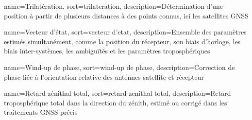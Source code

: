 {
    name={Trilatération},
    sort={trilateration},
    description={Détermination d'une position à partir de plusieurs distances à des points connus, ici les satellites GNSS}
}

{
    name={Vecteur d'état},
    sort={vecteur d'etat},
    description={Ensemble des paramètres estimés simultanément, comme la position du récepteur, son biais d'horloge, les biais inter-systèmes, les ambiguïtés et les paramètres troposphériques}
}

{
    name={Wind-up de phase},
    sort={wind-up de phase},
    description={Correction de phase liée à l'orientation relative des antennes satellite et récepteur}
}

{
    name={Retard zénithal total},
    sort={retard zenithal total},
    description={Retard troposphérique total dans la direction du zénith, estimé ou corrigé dans les traitements GNSS précis}
}
